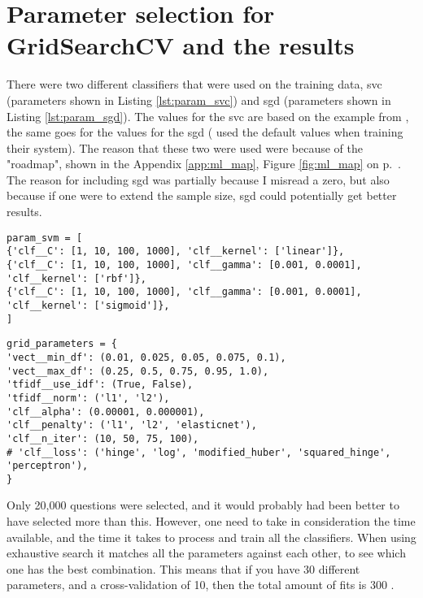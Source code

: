 \section{Parameter selection for GridSearchCV and the results}
\label{sec:grid_search_and_results}
There were two different classifiers that were used on the training data, \gls{svc} (parameters shown in Listing \ref{lst:param_svc}) and \gls{sgd} 
(parameters shown in Listing \ref{lst:param_sgd}).
The values for the \gls{svc} are based on the example from \textcite{Scikitlearn.org2016k}, the same goes for the values for the \gls{sgd} \textcite{Scikitlearn.org2016l} 
(\cite{Huang2008, Maas2011, Zhang2003} used the default values when training their system). 
The reason that these two were used were because of the "roadmap", shown in the Appendix \ref{app:ml_map}, Figure \ref{fig:ml_map} on p.~\pageref{app:ml_map}. 
The reason for including \gls{sgd} was partially because I misread a zero, but also because if one were to extend the sample size, \gls{sgd} could potentially get better results.
\begin{lstlisting}[caption={Parameters for SVC}, label={lst:param_svc}] 
param_svm = [
{'clf__C': [1, 10, 100, 1000], 'clf__kernel': ['linear']},
{'clf__C': [1, 10, 100, 1000], 'clf__gamma': [0.001, 0.0001], 'clf__kernel': ['rbf']},
{'clf__C': [1, 10, 100, 1000], 'clf__gamma': [0.001, 0.0001], 'clf__kernel': ['sigmoid']},
]
\end{lstlisting}
\begin{lstlisting}[caption={Parameters for SGD}, label={lst:param_sgd}] 
grid_parameters = {
'vect__min_df': (0.01, 0.025, 0.05, 0.075, 0.1),
'vect__max_df': (0.25, 0.5, 0.75, 0.95, 1.0),
'tfidf__use_idf': (True, False),
'tfidf__norm': ('l1', 'l2'),
'clf__alpha': (0.00001, 0.000001),
'clf__penalty': ('l1', 'l2', 'elasticnet'),
'clf__n_iter': (10, 50, 75, 100),
# 'clf__loss': ('hinge', 'log', 'modified_huber', 'squared_hinge', 'perceptron'),
}
\end{lstlisting}
Only 20,000 questions were selected, and it would probably had been better to have selected more than this. 
However, one need to take in consideration the time available, and the time it takes to process and train all the classifiers. 
When using exhaustive search it matches all the parameters against each other, to see which one has the best combination. 
This means that if you have 30 different parameters, and a cross-validation of 10, then the total amount of fits is 300 \cite{Markham2015a}.
